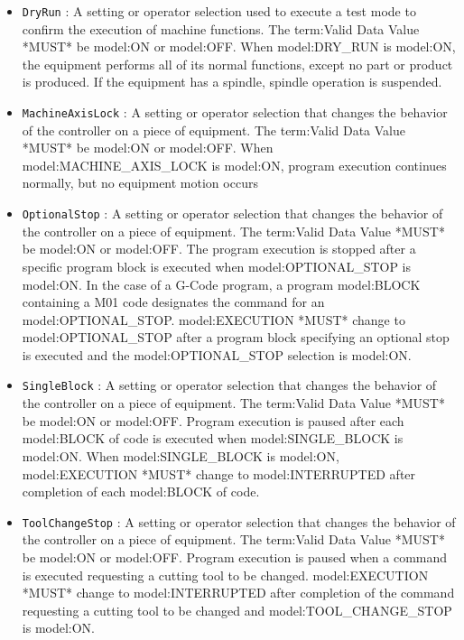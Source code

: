 \begin{itemize}

\item \texttt{DryRun} : A setting or operator selection used to execute a test mode to confirm the execution of machine functions. 
 The {term:Valid Data Value} *MUST* be {model:ON} or {model:OFF}. 
 When {model:DRY_RUN} is {model:ON}, the equipment performs all of its normal functions, except no part or product is produced.  If the equipment has a spindle, spindle operation is suspended.

\item \texttt{MachineAxisLock} : A setting or operator selection that changes the behavior of the controller on a piece of equipment. 
 The {term:Valid Data Value} *MUST* be {model:ON} or {model:OFF}. 
 When {model:MACHINE_AXIS_LOCK} is {model:ON}, program execution continues normally, but no equipment motion occurs 

\item \texttt{OptionalStop} : A setting or operator selection that changes the behavior of the controller on a piece of equipment. 
 The {term:Valid Data Value} *MUST* be {model:ON} or {model:OFF}.
 The program execution is stopped after a specific program block is executed when {model:OPTIONAL_STOP} is {model:ON}.    
 In the case of a G-Code program, a program {model:BLOCK} containing a M01 code designates the command for an {model:OPTIONAL_STOP}. 
 {model:EXECUTION} *MUST* change to {model:OPTIONAL_STOP} after a program block specifying an optional stop is executed and the {model:OPTIONAL_STOP} selection is {model:ON}.

\item \texttt{SingleBlock} : A setting or operator selection that changes the behavior of the controller on a piece of equipment. 
 The {term:Valid Data Value} *MUST* be {model:ON} or {model:OFF}.
 Program execution is paused after each {model:BLOCK} of code is executed when {model:SINGLE_BLOCK} is {model:ON}.   
 When {model:SINGLE_BLOCK} is {model:ON}, {model:EXECUTION} *MUST* change to {model:INTERRUPTED} after completion of each {model:BLOCK} of code. 

\item \texttt{ToolChangeStop} : A setting or operator selection that changes the behavior of the controller on a piece of equipment. 
 The {term:Valid Data Value} *MUST* be {model:ON} or {model:OFF}. 
 Program execution is paused when a command is executed requesting a cutting tool to be changed. 
 {model:EXECUTION} *MUST* change to {model:INTERRUPTED} after completion of the command requesting a cutting tool to be changed and {model:TOOL_CHANGE_STOP} is {model:ON}.

\end{itemize}

